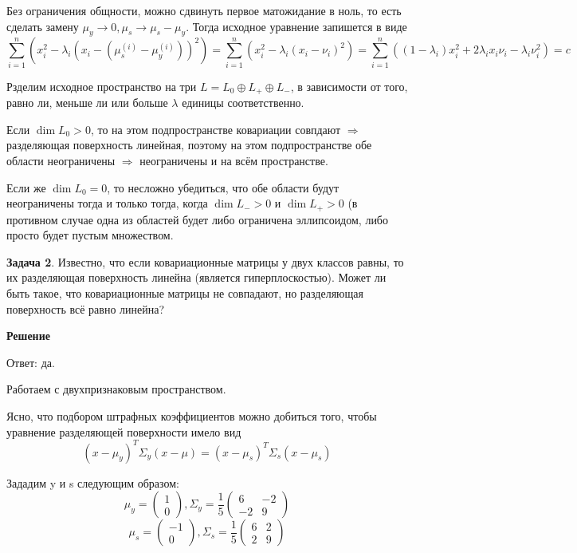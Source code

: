 Без ограничения общности, можно сдвинуть первое матожидание в ноль, то есть сделать замену $\mu_y \longrightarrow 0, \mu_{s} \longrightarrow \mu_{s} - \mu_{y}$. Тогда исходное уравнение запишется в виде \[\sum_{i=1}^{n}(x_{i}^2 - \lambda_{i}(x_{i} - (\mu_{s}^{(i)} - \mu_{y}^{(i)}))^2) = \sum_{i=1}^{n}(x_{i}^2 - \lambda_{i}(x_{i} - \nu_{i})^2) = \sum_{i=1}^{n}((1-\lambda_i)x_{i}^2 + 2\lambda_{i}x_{i}\nu_{i} - \lambda_{i}\nu_{i}^2) = c\]

Рзделим исходное пространство на три $L = L_0 \oplus L_+ \oplus L_-$, в зависимости от того, равно ли, меньше ли или больше $\lambda$ единицы соответственно.

Если $\dim L_0 > 0$, то на этом подпространстве ковариации совпдают $\Longrightarrow$ разделяющая поверхность линейная, поэтому на этом подпространстве обе области неограничены $\Longrightarrow$ неограничены и на всём пространстве.

Если же $\dim L_0 = 0$, то несложно убедиться, что обе области будут неограничены тогда и только тогда, когда $\dim L_- > 0$ и $\dim L_+ > 0$ (в противном случае одна из областей будет либо ограничена эллипсоидом, либо просто будет пустым множеством.


\textbf{Задача 2}. Известно, что если ковариационные матрицы у двух классов равны, то их разделяющая поверхность линейна (является гиперплоскостью). Может ли быть такое, что ковариационные матрицы не совпадают, но разделяющая поверхность всё равно линейна?

\textbf{Решение}

Ответ: да.

Работаем с двухпризнаковым пространством.

Ясно, что подбором штрафных коэффициентов можно добиться того, чтобы уравнение разделяющей поверхности имело вид \[(x-\mu_{y})^{T}\Sigma_{y}(x-\mu) = (x-\mu_{s})^{T}\Sigma_{s}(x-\mu_{s})\]

Зададим y и s следующим образом: \[\begin{equation*}
\mu_y = \begin{pmatrix}
1\\
0
\end{pmatrix},
\Sigma_y = \frac{1}{5}
\begin{pmatrix}
6 & -2\\
-2 & 9
\end{pmatrix}
\end{equation*}\]
\[\begin{equation*}
\mu_s = \begin{pmatrix}
-1\\
0
\end{pmatrix},
\Sigma_s = \frac{1}{5}
\begin{pmatrix}
6 & 2\\
2 & 9
\end{pmatrix}
\end{equation*}\]

